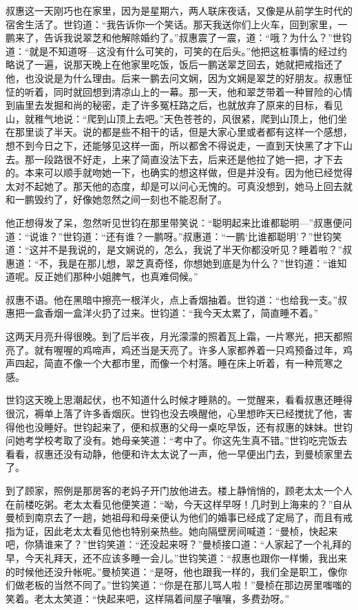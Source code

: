 \par 叔惠这一天刚巧也在家里，因为是星期六，两人联床夜话，又像是从前学生时代的宿舍生活了。世钧道：“我告诉你一个笑话。那天我送你们上火车，回到家里，一鹏来了，告诉我说翠芝和他解除婚约了。”叔惠震了一震，道：“哦？为什么？”世钧道：“就是不知道呀—这没有什么可笑的，可笑的在后头。”他把这桩事情的经过约略说了一遍，说那天晚上在他家里吃饭，饭后一鹏送翠芝回去，她就把戒指还了他，也没说是为什么理由。后来一鹏去问文娴，因为文娴是翠芝的好朋友。叔惠怔怔的听着，同时就回想到清凉山上的一幕。那一天，他和翠芝带着一种冒险的心情到庙里去发掘和尚的秘密，走了许多冤枉路之后，也就放弃了原来的目标，看见山，就稚气地说：“爬到山顶上去吧。”天色苍苍的，风很紧，爬到山顶上，他们坐在那里谈了半天。说的都是些不相干的话，但是大家心里或者都有这样一个感想，想不到今日之下，还能够见这样一面，所以都舍不得说走，一直到天快黑了才下山去。那一段路很不好走，上来了简直没法下去，后来还是他拉了她一把，才下去的。本来可以顺手就吻她一下，也确实的想这样做，但是并没有。因为他已经觉得太对不起她了。那天他的态度，却是可以问心无愧的。可真没想到，她马上回去就和一鹏毁约了，好像她忽然之间一刻也不能忍耐了。
\par 他正想得发了呆，忽然听见世钧在那里带笑说：“聪明起来比谁都聪明—”叔惠便问道：“说谁？”世钧道：“还有谁？一鹏呀。”叔惠道：“一鹏‘比谁都聪明’？”世钧笑道：“这并不是我说的，是文娴说的，怎么，我说了半天你都没听见？睡着啦？”叔惠道：“不，我是在那儿想，翠芝真奇怪，你想她到底是为什么？”世钧道：“谁知道呢。反正她们那种小姐脾气，也真难伺候。”
\par 叔惠不语。他在黑暗中擦亮一根洋火，点上香烟抽着。世钧道：“也给我一支。”叔惠把一盒香烟一盒洋火扔了过来。世钧道：“我今天太累了，简直睡不着。”
\par 这两天月亮升得很晚。到了后半夜，月光濛濛的照着瓦上霜，一片寒光，把天都照亮了。就有喔喔的鸡啼声，鸡还当是天亮了。许多人家都养着一只鸡预备过年，鸡声四起，简直不像一个大都市里，而像一个村落。睡在床上听着，有一种荒寒之感。
\par 世钧这天晚上思潮起伏，也不知道什么时候才睡熟的。一觉醒来，看看叔惠还睡得很沉，褥单上落了许多香烟灰。世钧也没去唤醒他，心里想昨天已经搅扰了他，害得他也没睡好。世钧起来了，便和叔惠的父母一桌吃早饭，还有叔惠的妹妹。世钧问她考学校考取了没有。她母亲笑道：“考中了。你这先生真不错。”世钧吃完饭去看看，叔惠还没有动静，他便和许太太说了一声，他一早便出门去，到曼桢家里去了。
\par 到了顾家，照例是那房客的老妈子开门放他进去。楼上静悄悄的，顾老太太一个人在前楼吃粥。老太太看见他便笑道：“呦，今天这样早呀！几时到上海来的？”自从曼桢到南京去了一趟，她祖母和母亲便认为他们的婚事已经成了定局了，而且有戒指为证，因此老太太看见他也特别亲热些。她向隔壁房间喊道：“曼桢，快起来吧，你猜谁来了？”世钧笑道：“还没起来呀？”曼桢接口道：“人家起了一个礼拜的早，今天礼拜天，还不应该多睡一会儿。”世钧笑道：“叔惠也跟你一样懒，我出来的时候他还没升帐呢。”曼桢笑道：“是呀，他也跟我一样的，我们全是职工，像你们做老板的当然不同了。”世钧笑道：“你是在那儿骂人啦！”曼桢在那边房里嗤嗤的笑着。老太太笑道：“快起来吧，这样隔着间屋子嚷嚷，多费劲呀。”
